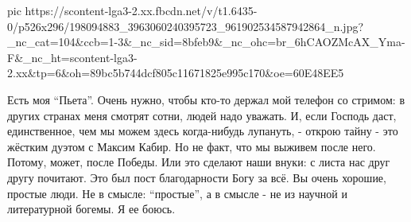 \ifcmt
  pic https://scontent-lga3-2.xx.fbcdn.net/v/t1.6435-0/p526x296/198094883_3963060240395723_961902534587942864_n.jpg?_nc_cat=104&ccb=1-3&_nc_sid=8bfeb9&_nc_ohc=br_6hCAOZMcAX_Yma-F&_nc_ht=scontent-lga3-2.xx&tp=6&oh=89bc5b744dcf805c11671825e995c170&oe=60E48EE5
\fi

Есть моя \enquote{Пьета}. Очень нужно, чтобы кто-то держал мой телефон со стримом: в
других странах меня смотрят сотни, людей надо уважать. И, если Господь даст,
единственное, чем мы можем здесь когда-нибудь лупануть, - открою тайну - это
жёстким дуэтом с Максим Кабир. Но не факт, что мы выживем после него. Потому,
может, после Победы. Или это сделают наши внуки: с листа нас друг другу
почитают.  Это был пост благодарности Богу за всё. Вы очень хорошие, простые
люди. Не в смысле: \enquote{простые}, а в смысле - не из научной и  литературной
богемы. Я ее боюсь.
